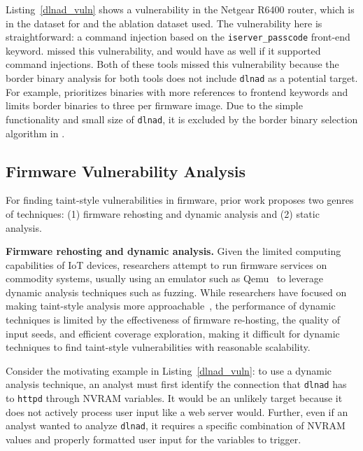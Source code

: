 Listing~\ref{dlnad_vuln} shows a vulnerability in the Netgear R6400 router, which is in the dataset for \karonte and the ablation dataset \satc used.
The vulnerability here is straightforward: a command injection based on the \texttt{iserver\_passcode} front-end keyword.
\satc missed this vulnerability, and \karonte would have as well if it supported command injections.
Both of these tools missed this vulnerability because the border binary analysis for both tools does not include \texttt{dlnad} as a potential target.
For example, \satc prioritizes binaries with more references to frontend keywords and limits border binaries to three per firmware image.
Due to the simple functionality and small size of \texttt{dlnad}, it is excluded by the border binary selection algorithm in \satc.

\subsection{Firmware Vulnerability Analysis}
\label{sec:observation}

For finding taint-style vulnerabilities in firmware, prior work proposes two genres of techniques:
(1) firmware rehosting and dynamic analysis and (2) static analysis.

\smallskip
\noindent
\textbf{Firmware rehosting and dynamic analysis.}
Given the limited computing capabilities of IoT devices, researchers attempt to run firmware services on commodity systems, usually using an emulator such as Qemu~\cite{qemu} to leverage dynamic analysis techniques such as fuzzing.
While researchers have focused on making taint-style analysis more approachable~\cite{clause2007dytan,ming2016straighttaint,ming2015taintpipe}, the performance of dynamic techniques is limited by the effectiveness of firmware re-hosting, the quality of input seeds, and efficient coverage exploration, making it difficult for dynamic techniques to find taint-style vulnerabilities with reasonable scalability.

Consider the motivating example in Listing~\ref{dlnad_vuln}: to use a dynamic analysis technique, an analyst must first identify the connection that \texttt{dlnad} has to \texttt{httpd} through NVRAM variables.
It would be an unlikely target because it does not actively process user input like a web server would.
Further, even if an analyst wanted to analyze \texttt{dlnad}, it requires a specific combination of NVRAM values and properly formatted user input for the variables to trigger.

